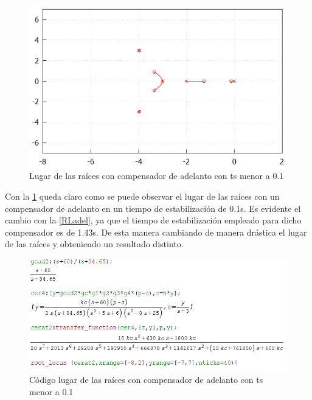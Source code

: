 \documentclass[12pt,letterpaper]{article}
\begin{document}
 \begin{figure}[H]
            \centering
            \centerline{\includegraphics[width=125mm]{RLadel2.png}}
            \caption{Lugar de las raíces con compensador de adelanto con ts menor a 0.1}
            \label{RLadel2}
\end{figure}

Con la \ref{RLadel2} queda claro como se puede observar el lugar de las raíces con un compensador de adelanto en un tiempo de estabilización de 0.1s. Es evidente el cambio con la \ref{RLadel}, ya que el tiempo de estabilización empleado para dicho compensador es de 1.43s. De esta manera cambiando de manera drástica el lugar de las raíces y obteniendo un resultado distinto.

 \begin{figure}[H]
            \centering
            \centerline{\includegraphics[width=150mm]{RLadelcode2.png}}
            \caption{Código lugar de las raíces con compensador de adelanto con ts menor a 0.1}
            \label{RLadelcode2}
\end{figure}
\end{document}
